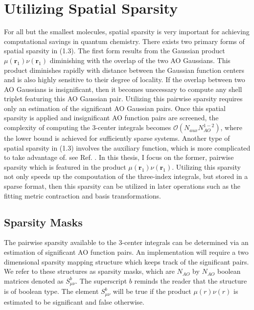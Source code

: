 \chapter{Utilizing Spatial Sparsity}

For all but the smallest molecules, spatial sparsity is very important for achieving computational savings
in quantum chemistry. There exists two primary forms of spatial sparsity in (1.3). The first form
results from the Gaussian product $\mu(\textbf{r}_{1}) \nu(\textbf{r}_{1})$ diminishing with the overlap of the 
two AO Gaussians. This product diminishes rapidly with distance between the Gaussian function centers and is also 
highly sensitive to their degree of locality.
If the overlap between two AO Gaussians is insignificant, then it becomes unecessary to compute any shell triplet featuring
this AO Gaussian pair.
Utilizing this pairwise sparsity requires only an estimation of the significant AO Gaussian pairs.
Once this spatial sparsity is applied and insignificant AO function pairs are screened, the complexity of 
computing the 3-center integrals becomes $\mathcal{O}(N_{aux}N_{AO}^{1-2})$, where the lower bound is achieved for sufficiently 
sparse systems. Another type of spatial sparsity in (1.3) involves the auxiliary function, which is more complicated to 
take advantage of. see Ref. \cite{Werner:2003:8149}. In this thesis, I focus on the former, pairwise sparsity which is featured
in the product $\mu(\textbf{r}_{1}) \nu(\textbf{r}_{1})$. 
Utilizing this sparsity not only speeds up the compoutation of the three-index integrals, but stored in a sparse format,
then this sparsity can be utilized in later operations such as the fitting metric contraction and basis transformations.

\section{Sparsity Masks}

The pairwise sparsity available to the 3-center integrals can be determined via an estimation of significant AO function pairs.
An implementation will require a two dimensional sparsity mapping structure which keeps track of the significant pairs.
We refer to these structures as sparsity masks, which are $N_{AO}$ by $N_{AO}$ boolean matrices denoted as $S_{\mu \nu}^b$. 
The superscript $b$ reminds the reader that the structure is of boolean type.
The element $S_{\mu \nu}^b$ will be true if the product $\mu(r)\nu(r)$ is estimated to be significant 
and false otherwise.

